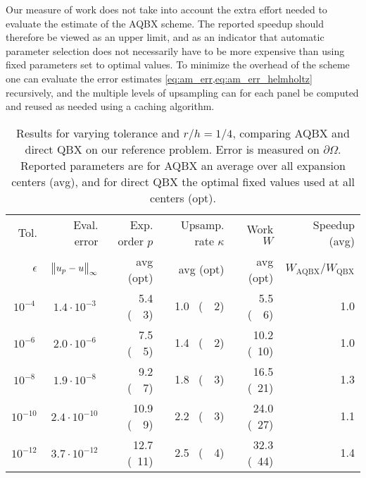 \documentclass[hidelinks]{siamart1116}
\begin{document}
Our measure of work does not take into account the extra effort needed
to evaluate the estimate of the AQBX scheme. The reported speedup
should therefore be viewed as an upper limit, and as an indicator that
automatic parameter selection does not necessarily have to be more
expensive than using fixed parameters set to optimal values. To
minimize the overhead of the scheme one can evaluate the error
estimates \cref{eq:am_err,eq:am_err_helmholtz} recursively, and the
multiple levels of upsampling can for each panel be computed and
reused as needed using a caching algorithm.

\begin{table}[htbp]
  \centering
  \begin{tabular}{r|r|r|r|r|r}
    \hline
    Tol. & Eval. error & Exp. order $p$ & Upsamp. rate ${\kappa}$ & Work ${{W}}$ &Speedup (avg)\\
    ${\epsilon}$ & $\norm{u_p - u}_{\infty}$ & avg (opt) & avg (opt) & avg (opt) & ${{W}}_{\text{AQBX}} / {{W}}_{\text{QBX}}$  \\
    \hline
     $10^{-4~}$ & $1.4\cdot 10^{-3~}$  & ~5.4  (~~3) & 1.0~ (~~2)  & ~5.5 (~~6)  &  1.0 \\
     $10^{-6~}$ & $2.0\cdot 10^{-6~}$  & ~7.5  (~~5) & 1.4~ (~~2)  & 10.2 (~10)  &  1.0 \\
     $10^{-8~}$ & $1.9\cdot 10^{-8~}$  & ~9.2  (~~7) & 1.8~ (~~3)  & 16.5 (~21)  &  1.3 \\
     $10^{-10}$ & $2.4\cdot 10^{-10}$  & 10.9  (~~9) & 2.2~ (~~3)  & 24.0 (~27)  &  1.1 \\
     $10^{-12}$ & $3.7\cdot 10^{-12}$  & 12.7  (~11) & 2.5~ (~~4)  & 32.3 (~44)  &  1.4 \\
    \hline
  \end{tabular}
  \caption{Results for varying tolerance and $r/h=1/4$, comparing AQBX and direct QBX on our reference problem. Error is measured on ${{\partial\Omega}}$. Reported parameters are for AQBX an average over all expansion centers (avg), and for direct QBX the optimal fixed values used at all centers (opt).}
  \label{tab:tol_work}
\end{table}
\end{document}

